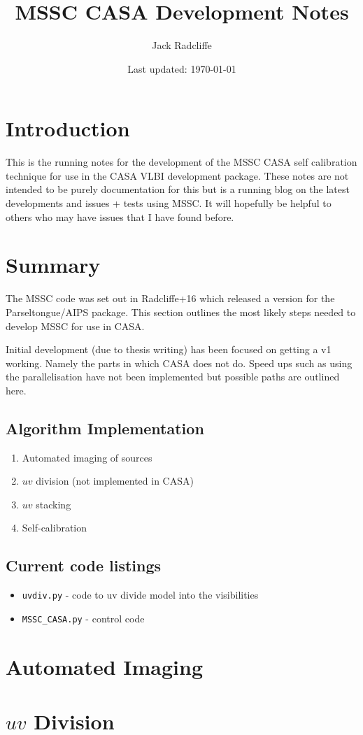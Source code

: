 
\immediate{}


        
        \title{MSSC CASA Development Notes}
        \date{Last updated: \today}
        \author{Jack Radcliffe}
        \maketitle
        \tableofcontents
        
\section*{Introduction}
This is the running notes for the development of the MSSC CASA self calibration technique for use in the CASA VLBI development package. These notes are not intended to be purely documentation for this but is a running blog on the latest developments and issues + tests using MSSC. It will hopefully be helpful to others who may have issues that I have found before. 

\section*{Summary}
The MSSC code was set out in Radcliffe+16 which released a version for the Parseltongue/AIPS package. This section outlines the most likely steps needed to develop MSSC for use in CASA. 

Initial development (due to thesis writing) has been focused on getting a v1 working. Namely the parts in which CASA does not do. Speed ups such as using the parallelisation have not been implemented but possible paths are outlined here. 

\subsection*{Algorithm Implementation}
\begin{enumerate}
	\item Automated imaging of sources
	\item $uv$ division (not implemented in CASA)
	\item $uv$ stacking
	\item Self-calibration
\end{enumerate}

\subsection*{Current code listings}
\begin{itemize}
	\item \texttt{uvdiv.py} - code to uv divide model into the visibilities
	\item \texttt{MSSC\_CASA.py} - control code
\end{itemize}

\section{Automated Imaging}

\section{$uv$ Division}





      
